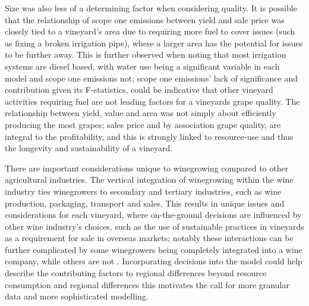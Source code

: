 \documentclass[review,12pt,authoryear]{elsarticle}
\begin{document}
\begin{linenumbers}
Size was also less of a determining factor when considering quality. It is possible that the relationship of scope one emissions between yield and sale price was closely tied to a vineyard's area due to requiring more fuel to cover issues (such as fixing a broken irrigation pipe), where  a larger area has the potential for issues to be further away. This is further observed when noting that most irrigation systems are diesel based, with water use being a significant variable in each model and scope one emissions not; scope one emissions' lack of significance and contribution given its F-statistics, could be indicative that other vineyard activities requiring fuel are not leading factors for a vineyards grape quality. The relationship between yield, value and area was not simply about efficiently producing the most grapes; sales price and by association grape quality, are integral to the profitability, and this is strongly linked to resource-use and thus the longevity and sustainability of a vineyard.
\par
There are important considerations unique to winegrowing compared to other agricultural industries. The vertical integration of winegrowing within the wine industry ties winegrowers to secondary and tertiary industries, such as wine production, packaging, transport and sales. This results in unique issues and considerations for each vineyard, where on-the-ground decisions are influenced by other wine industry's choices, such as the use of sustainable practices in vineyards as a requirement for sale in overseas markets; notably these interactions can be further complicated by some winegrowers being completely integrated into a wine company, while others are not \citep{knightFirmResourcesDevelopment2019}. Incorporating decisions into the model could help describe the contributing factors to regional differences beyond resource consumption and regional differences this  motivates the call for more granular data and more sophisticated modelling.

\end{linenumbers}
\end{document}
